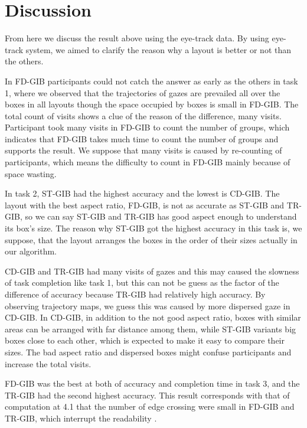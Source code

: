 \documentclass{llncs}
\begin{document}
\section{Discussion}
From here we discuss the result above using the eye-track data.
By using eye-track system, we aimed to clarify the reason why a layout is better or not than the others.

In FD-GIB participants could not catch the answer as early as the others in task 1, where we observed that the trajectories of gazes are prevailed all over the boxes in all layouts though the space occupied by boxes is small in FD-GIB.
The total count of visits shows a clue of the reason of the difference, many visits.
Participant took many visits in FD-GIB to count the number of groups, which indicates that FD-GIB takes much time to count the number of groups and supports the result.
We suppose that many visits is caused by re-counting of participants, which means the difficulty to count in FD-GIB mainly because of space wasting.

In task 2, ST-GIB had the highest accuracy and the lowest is CD-GIB.
The layout with the best aspect ratio, FD-GIB, is not as accurate as ST-GIB and TR-GIB, so we can say ST-GIB and TR-GIB has good aspect enough to understand its box's size.
The reason why ST-GIB got the highest accuracy in this task is, we suppose, that the layout arranges the boxes in the order of their sizes actually in our algorithm.

CD-GIB and TR-GIB had many visits of gazes and this may caused the slowness of task completion like task 1, but this can not be guess as the factor of the difference of accuracy because TR-GIB had relatively high accuracy.
By observing trajectory maps, we guess this was caused by more dispersed gaze in CD-GIB.
In CD-GIB, in addition to the not good aspect ratio, boxes with similar areas can be arranged with far distance among them, while ST-GIB variants big boxes close to each other, which is expected to make it easy to compare their sizes.
The bad aspect ratio and dispersed boxes might confuse participants and increase the total visits.

FD-GIB was the best at both of accuracy and completion time in task 3, and the TR-GIB had the second highest accuracy.
This result corresponds with that of computation at 4.1 that the number of edge crossing were small in FD-GIB and TR-GIB, which interrupt the readability \cite{becker,pur97,pur98,pca}.
\end{document}

